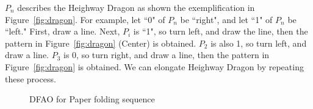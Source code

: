 \documentclass[runningheads,a4]{llncs}
\begin{document}
$P_n$ describes the Heighway Dragon as shown the exemplification in Figure~\ref{fig:dragon}.
For example, let ``0" of $P_n$ be ``right", and let ``1" of $P_n$ be ``left."
First, draw a line.
Next, $P_i$ is ``1", so turn left, and draw the line, then the pattern in Figure~\ref{fig:dragon} (Center) is obtained.
$P_2$ is also 1, so turn left, and draw a line.
$P_3$ is 0, so turn right, and draw a line, then the pattern in Figure~\ref{fig:dragon} is obtained.
We can elongate Heighway Dragon by repeating these process.
\begin{figure}[h]
  	\centering
\caption{DFAO for Paper folding sequence\cite{automatic}}
\label{fig:pdfao}
\end{figure}


\end{document}
